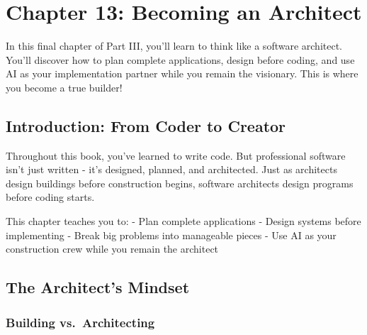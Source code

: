 \documentclass[
  letterpaper,
  DIV=11,
  numbers=noendperiod,
  oneside]{scrreprt}
\begin{document}
\chapter{Chapter 13: Becoming an
Architect}\label{sec-becoming-architect}

\begin{tcolorbox}[enhanced jigsaw, opacityback=0, colback=white, colframe=quarto-callout-note-color-frame, breakable, titlerule=0mm, coltitle=black, rightrule=.15mm, colbacktitle=quarto-callout-note-color!10!white, left=2mm, bottomtitle=1mm, bottomrule=.15mm, title=\textcolor{quarto-callout-note-color}{\faInfo}\hspace{0.5em}{Chapter Summary}, opacitybacktitle=0.6, toptitle=1mm, leftrule=.75mm, arc=.35mm, toprule=.15mm]

In this final chapter of Part III, you'll learn to think like a software
architect. You'll discover how to plan complete applications, design
before coding, and use AI as your implementation partner while you
remain the visionary. This is where you become a true builder!

\end{tcolorbox}

\section{Introduction: From Coder to
Creator}\label{introduction-from-coder-to-creator}

Throughout this book, you've learned to write code. But professional
software isn't just written - it's designed, planned, and architected.
Just as architects design buildings before construction begins, software
architects design programs before coding starts.

This chapter teaches you to: - Plan complete applications - Design
systems before implementing - Break big problems into manageable pieces
- Use AI as your construction crew while you remain the architect

\section{The Architect's Mindset}\label{the-architects-mindset}

\subsection{Building vs.~Architecting}\label{building-vs.-architecting}
\end{document}
